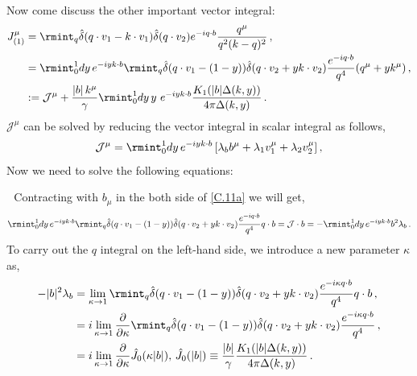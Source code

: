 Now come discuss the other important vector integral:
\begin{align}
    \begin{split}
J_{(1)}^{\mu}&=\rmint_q\hat\delta(q\cdot v_1-k\cdot v_1)\hat\delta(q\cdot v_2)e^{-iq\cdot b}\frac{q^{\mu}}{q^2(k-q)^2}\,,\\ &
=\rmint_{0}^1dy\, e^{-iyk\cdot b}\rmint_{q}\hat\delta(q\cdot v_1-(1-y))\hat\delta(q\cdot v_2+yk\cdot v_2)\frac{e^{-iq\cdot b}}{q^4}(q^\mu+yk^\mu)\,,\\ &
:=\mathcal{J}^{\mu}+\frac{|b|\,k^\mu}{\gamma}\rmint_{0}^1dy\,y\,\,e^{-iyk\cdot b}\frac{K_1(|b|\Delta(k,y))}{4\pi\Delta(k,y)}\,.\label{A.9 m}
    \end{split}
\end{align}
$\mathcal{J}^{\mu}$ can be solved by reducing the vector integral in scalar integral as follows,
\begin{align}
    \begin{split}
\mathcal{J}^{\mu}=\rmint_{0}^1dy\,e^{-iyk\cdot b}\,[\lambda_b b^{\mu}+\lambda_1 v_1^{\mu}+\lambda_2v_2^\mu]\,,\label{C.11a}
    \end{split}
\end{align}
Now we need to solve the following equations:\par
    \textbullet $\,\,$ Contracting with $ b_{\mu}$ in the both side of \eqref{C.11a} we will get,
\begin{align}
    \begin{split}
 \rmint_{0}^1dy\, e^{-iyk\cdot b}\rmint_{q}\hat\delta(q\cdot v_1-(1-y))\hat\delta(q\cdot v_2+yk\cdot v_2)\frac{e^{-iq\cdot b}}{q^4}q\cdot b=\mathcal{J}\cdot b=-\rmint_0^1 dy\,e^{-iyk\cdot b}b^2\lambda_b\,.
    \end{split}
\end{align}
To carry out the $q$ integral on the left-hand side, we introduce a new parameter $\kappa$ as,
\begin{align}
    \begin{split}
        -|b|^2\lambda_b&=\lim_{\kappa \rightarrow 1}\rmint_{q}\hat\delta(q\cdot v_1-(1-y))\hat\delta(q\cdot v_2+yk\cdot v_2)\frac{e^{-i\kappa q\cdot b}}{q^4}q\cdot b\,,\\ &
        =i\lim_{\kappa \rightarrow 1}\frac{\partial }{\partial \kappa}\rmint_{q}\hat\delta(q\cdot v_1-(1-y))\hat\delta(q\cdot v_2+yk\cdot v_2)\frac{e^{-i\kappa q\cdot b}}{q^4}\,,\\ &
=i\lim_{\kappa\rightarrow 1}\frac{\partial}{\partial \kappa}\hat{J}_0(\kappa |b|),\,\hat J_{0}(|b|)\equiv \frac{|b|}{\gamma}\frac{K_{1}(|b|\Delta(k,y))}{4\pi \Delta(k,y)}\,.
    \end{split}
\end{align}
